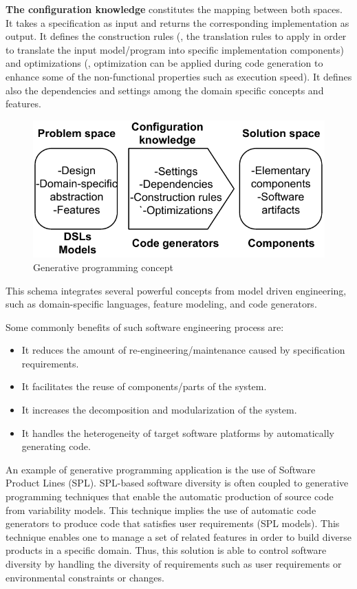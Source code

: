 \textbf{The configuration knowledge} constitutes the mapping between both spaces. It takes a specification as input and returns the corresponding implementation as output. It defines the construction rules (\ie, the translation rules to apply in order to translate the input model/program into specific implementation components) and optimizations (\ie, optimization can be applied during code generation to enhance some of the non-functional properties such as execution speed). It defines also the dependencies and settings among the domain specific concepts and features.

\begin{figure}[h]
	\center
	\includegraphics[scale=0.65]{Background/fig/GDM.pdf}
	\caption{Generative programming concept}
	\label{fig:GDM}
\end{figure}
This schema integrates several powerful concepts from model driven engineering, such as domain-specific languages, feature modeling, and code generators.

Some commonly benefits of such software engineering process are:
\begin{itemize}
\item It reduces the amount of re-engineering/maintenance caused by specification requirements.
\item It facilitates the reuse of components/parts of the system.
\item It increases the decomposition and modularization of the system.
\item It handles the heterogeneity of target software platforms by automatically generating code.
\end{itemize}

An example of generative programming application is the use of Software Product Lines (SPL)\cite{schaefer2012software}.
SPL-based software diversity is often coupled to generative programming techniques\cite{Czarnecki:2000:GPM:345203} that enable the automatic production of source code from variability models. This technique implies the use of automatic code generators to produce code that satisfies user requirements (SPL models).
This technique enables one to manage a set of related features in order to build diverse products in a specific domain. Thus, this solution is able to control software diversity by handling the diversity of requirements such as user requirements or environmental constraints or changes. 

